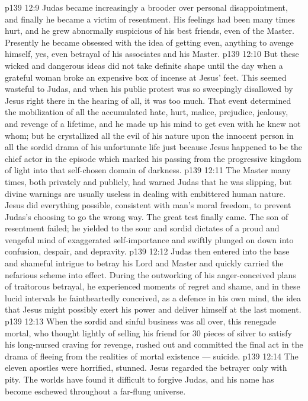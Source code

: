 \vs p139 12:9 \pc Judas became increasingly a brooder over personal disappointment, and finally he became a victim of resentment. His feelings had been many times hurt, and he grew abnormally suspicious of his best friends, even of the Master. Presently he became obsessed with the idea of getting even, anything to avenge himself, yes, even betrayal of his associates and his Master.
\vs p139 12:10 But these wicked and dangerous ideas did not take definite shape until the day when a grateful woman broke an expensive box of incense at Jesus’ feet. This seemed wasteful to Judas, and when his public protest was so sweepingly disallowed by Jesus right there in the hearing of all, it was too much. That event determined the mobilization of all the accumulated hate, hurt, malice, prejudice, jealousy, and revenge of a lifetime, and he made up his mind to get even with he knew not whom; but he crystallized all the evil of his nature upon the  innocent person in all the sordid drama of his unfortunate life just because Jesus happened to be the chief actor in the episode which marked his passing from the progressive kingdom of light into that self\hyp{}chosen domain of darkness.
\vs p139 12:11 The Master many times, both privately and publicly, had warned Judas that he was slipping, but divine warnings are usually useless in dealing with embittered human nature. Jesus did everything possible, consistent with man’s moral freedom, to prevent Judas’s choosing to go the wrong way. The great test finally came. The son of resentment failed; he yielded to the sour and sordid dictates of a proud and vengeful mind of exaggerated self\hyp{}importance and swiftly plunged on down into confusion, despair, and depravity.
\vs p139 12:12 Judas then entered into the base and shameful intrigue to betray his Lord and Master and quickly carried the nefarious scheme into effect. During the outworking of his anger\hyp{}conceived plans of traitorous betrayal, he experienced moments of regret and shame, and in these lucid intervals he faintheartedly conceived, as a defence in his own mind, the idea that Jesus might possibly exert his power and deliver himself at the last moment.
\vs p139 12:13 When the sordid and sinful business was all over, this renegade mortal, who thought lightly of selling his friend for 30 pieces of silver to satisfy his long\hyp{}nursed craving for revenge, rushed out and committed the final act in the drama of fleeing from the realities of mortal existence --- suicide.
\vs p139 12:14 The eleven apostles were horrified, stunned. Jesus regarded the betrayer only with pity. The worlds have found it difficult to forgive Judas, and his name has become eschewed throughout a far\hyp{}flung universe.
\quizlink
